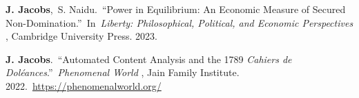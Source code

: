 \documentclass[letterpaper,11pt]{article}
\begin{document}
\textbf{J. Jacobs},~S. Naidu.~``Power in Equilibrium: An Economic Measure of Secured Non-Domination.''~In~\textit{Liberty: Philosophical, Political, and Economic Perspectives }, Cambridge University Press. 2023.\vspace{2mm}

\textbf{J. Jacobs}.~``Automated Content Analysis and the 1789 \textit{Cahiers de Dol\'{e}ances}.''~\textit{Phenomenal World }, Jain Family Institute. 2022.~\url{https://phenomenalworld.org/}\vspace{2mm}
\end{document}
